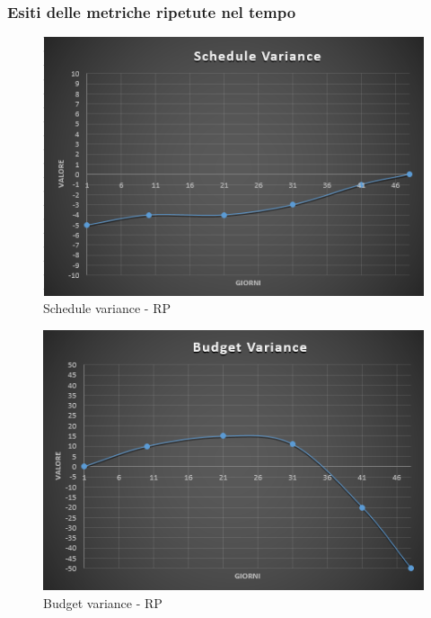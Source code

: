 \subsubsection{Esiti delle metriche ripetute nel tempo}

\begin{figure}[H]
	\centering 
	\includegraphics[scale=0.6]{Sezioni/Immagini/ScheduleVariance-RP}
	\caption{Schedule variance - RP}
\end{figure}

\begin{figure}[H]
	\centering 
	\includegraphics[scale=0.6]{Sezioni/Immagini/BudgetVariance-RP}
	\caption{Budget variance - RP}
\end{figure}

